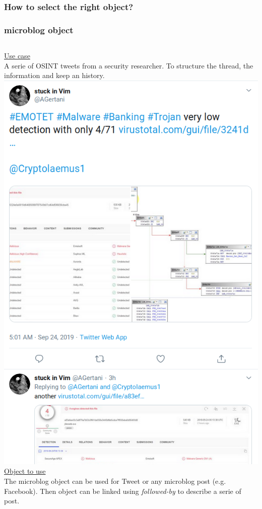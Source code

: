 \begin{frame}
        \frametitle{How to select the right object?}


\end{frame}

\begin{frame}
\frametitle{microblog object}
\begin{columns}[totalwidth=\textwidth]
        \underline{Use case}\\
A serie of OSINT tweets from a security researcher.
To structure the thread, the information
and keep an history.\\
        \includegraphics[scale=0.15]{emotet.png}
        \underline{Object to use}\\
        The microblog object can be used for Tweet or any microblog post (e.g. Facebook). Then object can be linked using {\it followed-by} to describe a serie of post.\\

\end{columns}
\end{frame}
